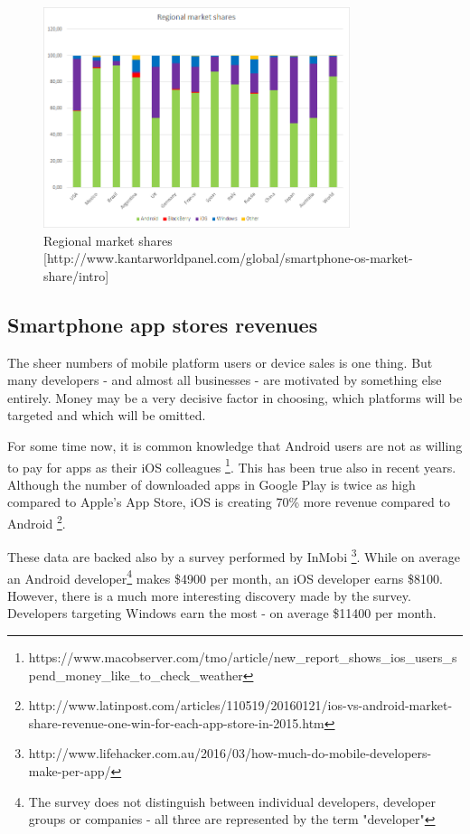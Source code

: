 \documentclass[english,master,public,dept460,male,cpdeclaration,oneside]{diploma}
\begin{document}
\begin{figure}
	\centering\includegraphics[width=0.8\textwidth]{Figures/regionalMarketShares.png}
	\caption{Regional market shares [http://www.kantarworldpanel.com/global/smartphone-os-market-share/intro]}
\end{figure}

\subsection{Smartphone app stores revenues}
The sheer numbers of mobile platform users or device sales is one thing. But many developers - and almost all businesses - are motivated by something else entirely. Money may be a very decisive factor in choosing, which platforms will be targeted and which will be omitted. 

For some time now, it is common knowledge that Android users are not as willing to pay for apps as their iOS colleagues \footnote{https://www.macobserver.com/tmo/article/new\_report\_shows\_ios\_users\_spend\_money\_like\_to\_check\_weather}. This has been true also in recent years. Although the number of downloaded apps in Google Play is twice as high compared to Apple’s App Store, iOS is creating 70\% more revenue compared to Android \footnote{http://www.latinpost.com/articles/110519/20160121/ios-vs-android-market-share-revenue-one-win-for-each-app-store-in-2015.htm}. 

These data are backed also by a survey performed by InMobi \footnote{http://www.lifehacker.com.au/2016/03/how-much-do-mobile-developers-make-per-app/}. While on average an Android developer\footnote{The survey does not distinguish between individual developers, developer groups or companies - all three are represented by the term "developer"} makes \$4900 per month, an iOS developer earns \$8100. However, there is a much more interesting discovery made by the survey. Developers targeting Windows earn the most - on average \$11400 per month.
\end{document}
